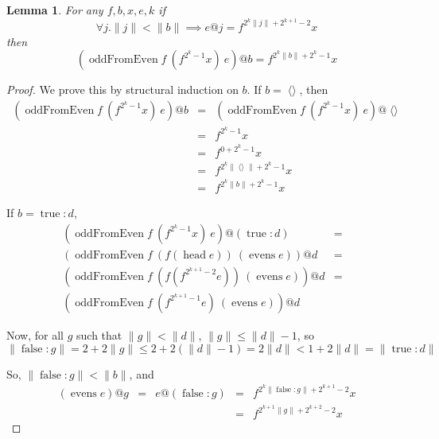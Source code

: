 \documentclass{llncs}
\DeclareMathOperator{\oddFrom}{oddFromEven}
\DeclareMathOperator{\nil}{\langle\rangle}
\DeclareMathOperator{\true}{true}
\DeclareMathOperator{\false}{false}
\DeclareMathOperator{\head}{head}
\DeclareMathOperator{\evens}{evens}
\newcommand{\ord}[1]{\|#1\|}
\newcommand{\cons}[2]{#1:#2}
\newtheorem{lemma}[theorem]{Lemma}
\begin{document}
\begin{lemma}\label{oddFromLemma}
For any $f, b, x, e, k$
if
\begin{displaymath}
\forall j . \ord{j} < \ord{b} \implies e@j = f^{2^k\ord{j}+2^{k+1}-2}x
\end{displaymath}
then
\begin{displaymath}
(\oddFrom f\ (f^{2^k-1}x)\ e)@b = f^{2^k\ord{b}+2^k-1}x
\end{displaymath}
\end{lemma}
\begin{proof}
We prove this by structural induction on $b$. If $b = \nil$, then 
\begin{displaymath}
\begin{array}{rcl}
(\oddFrom f\ (f^{2^k-1}x)\ e)@b & = & (\oddFrom f\ (f^{2^k-1}x)\ e)@\nil \\
& = & f^{2^k-1}x \\
& = & f^{0+2^k-1}x \\
& = & f^{2^k\ord{\nil}+2^k-1}x \\
& = & f^{2^k\ord{b}+2^k-1}x
\end{array}
\end{displaymath}

If $b = \cons{\true}{d}$,
\begin{displaymath}
\begin{array}{rcl}
(\oddFrom f\ (f^{2^k-1}x)\ e)@(\cons{\true}{d})& = & \\
(\oddFrom f\ (f (\head e))\ (\evens e))@d& = & \\
(\oddFrom f\ (f (f^{2^{k+1}-2}e))\ (\evens e))@d& = & \\
(\oddFrom f\ (f^{2^{k+1}-1}e)\ (\evens e))@d&  & 
\end{array}
\end{displaymath}

Now, for all $g$ such that $\ord{g} < \ord{d}$, $\ord{g} \leq \ord{d}-1$, so 
\begin{displaymath}
\ord{\cons{\false}{g}} = 2 + 2\ord{g} \leq 2 + 2(\ord{d} -1) = 2\ord{d} < 1+2\ord{d} = \ord{\cons{\true}{d}}
\end{displaymath}

So, $\ord{\cons{\false}{g}} < \ord{b}$, and 
\begin{displaymath}
\begin{array}{rcccl}
(\evens e)@g & = & e@(\cons{\false}{g}) & = & f^{2^k\ord{\cons{\false}{g}}+2^{k+1}-2}x \\
& & & = & f^{2^{k+1}\ord{g}+2^{k+2}-2}x 
\end{array}
\end{displaymath}


\end{proof}
\end{document}
